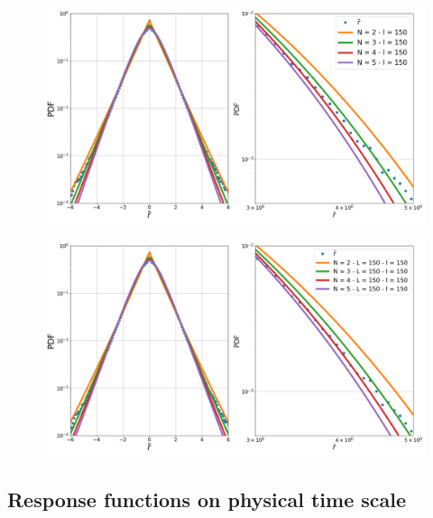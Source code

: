 \begin{figure}[htbp]
    \centering
    \includegraphics[width=0.7\columnwidth]
    {figures/08_ag.png}
    \caption{}
    \label{fig:ag_dist}
\end{figure}

\begin{figure}[htbp]
    \centering
    \includegraphics[width=0.7\columnwidth]
    {figures/08_aa.png}
    \caption{}
    \label{fig:aa_dist}
\end{figure}

\subsection{Response functions on physical time scale}
\label{subsec:response_function_physical}
